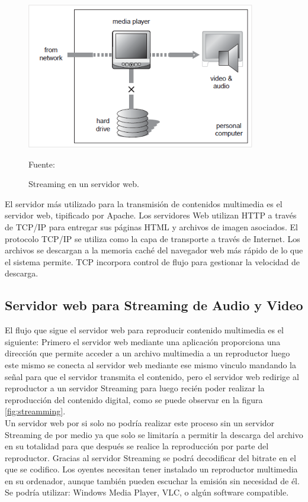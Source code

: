 \begin{figure}[H]
    \begin{center}
        \includegraphics[width=10cm]{img/capitulo_2/stream.png}
        \caption{Streaming en un servidor web.\\}
        Fuente: \cite{streamming:austerberry}
        \label{fig:stream}
    \end{center}
\end{figure}

El servidor más utilizado para la transmisión de contenidos multimedia es el servidor web, tipificado por Apache. Los servidores Web utilizan HTTP a través de TCP/IP para entregar sus páginas HTML y archivos de imagen asociados. El protocolo TCP/IP se utiliza como la capa de transporte a través de Internet. Los archivos se descargan a la memoria caché del navegador web más rápido de lo que el sistema permite. TCP incorpora control de flujo para gestionar la velocidad de descarga.\\
\subsection{Servidor web para Streaming de Audio y Video}

El flujo que sigue el servidor web para reproducir contenido multimedia es el siguiente: Primero el servidor web mediante una aplicación proporciona una dirección que permite acceder a un archivo multimedia a un reproductor luego este mismo se conecta al servidor web mediante ese mismo vinculo mandando la señal para que el servidor transmita el contenido, pero el servidor web redirige al reproductor a un servidor Streaming para luego recién poder realizar la reproducción del contenido digital, como se puede observar en la figura \ref{fig:streamming}.\\

Un servidor web por si solo no podría realizar este proceso sin un servidor Streaming de por medio ya que solo se limitaría a permitir la descarga del archivo en su totalidad para que después se realice la reproducción por parte del reproductor. Gracias al servidor Streaming se podrá decodificar del bitrate en el que se codifico. Los oyentes necesitan tener instalado un reproductor multimedia en su ordenador, aunque también pueden escuchar la emisión sin necesidad de él. Se podría utilizar: Windows Media Player, VLC, o algún software compatible.\\

